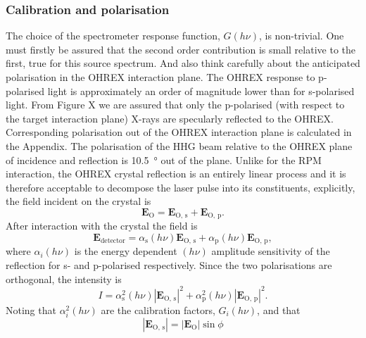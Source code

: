 \subsubsection{Calibration and polarisation}
The choice of the spectrometer response function, $G(h\nu)$, is non-trivial. One must firstly be assured that the second order contribution is small relative to the first, true for this source spectrum. And also think carefully about the anticipated polarisation in the OHREX interaction plane. The OHREX response to p-polarised light is approximately an order of magnitude lower than for s-polarised light. From Figure X we are assured that only the p-polarised (with respect to the target interaction plane) X-rays are specularly reflected to the OHREX. Corresponding polarisation out of the OHREX interaction plane is calculated in the Appendix. The polarisation of the HHG beam relative to the OHREX plane of incidence and reflection is \qty{10.5}{\degree} out of the plane. Unlike for the RPM interaction, the OHREX crystal reflection is an entirely linear process and it is therefore acceptable to decompose the laser pulse into its constituents, explicitly, the field incident on the crystal is
\begin{equation}
	\mathbf{E_\mathrm{O}} = \mathbf{E}_\mathrm{O,\, s} + \mathbf{E}_\mathrm{O,\, p}.
\end{equation}
After interaction with the crystal the field is
\begin{equation}
	\mathbf{E}_\mathrm{detector} = \alpha_\mathrm{s}(h\nu)\mathbf{E}_\mathrm{O,\, s} + \alpha_\mathrm{p}(h\nu)\mathbf{E}_\mathrm{O,\, p},
\end{equation}
where $\alpha_i(h\nu)$ is the energy dependent $(h\nu)$ amplitude sensitivity of the reflection for s- and p-polarised respectively. Since the two polarisations are orthogonal, the intensity is
\begin{equation}
	I = \alpha^2_\mathrm{s}(h\nu)|\mathbf{E}_\mathrm{O,\, s}|^2 + \alpha^2_\mathrm{p}(h\nu)|\mathbf{E}_\mathrm{O,\, p}|^2.
\end{equation}
Noting that $\alpha^2_i(h\nu)$ are the calibration factors, $G_i(h\nu)$, and that
\begin{equation}
	|\mathbf{E}_\mathrm{O,\, s}| = |\mathbf{E_\mathrm{O}}|\sin\phi
\end{equation}
